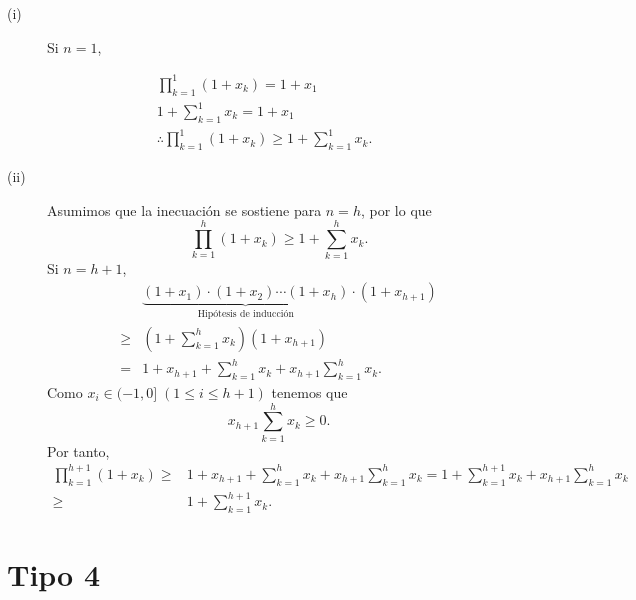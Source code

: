 \documentclass{article}
\begin{document}
\begin{sol}
\begin{description}
\item[(i)] Si $\displaystyle n = 1 $, 
\end{description}
\[
\begin{split}
& \prod^{1}_{k=1}\left(1+x_{k}\right) = 1 + x_{1} \\
& 1 + \sum^{1}_{k=1}x_{k} = 1 + x_{1} \\
& \therefore \prod^{1}_{k=1}\left(1+x_{k}\right) \geq 1 + \sum^{1}_{k=1}x_{k}.
\end{split}
\]
\begin{description}
\item[(ii)] Asumimos que la inecuación se sostiene para $\displaystyle n = h $, por lo que
\[\prod^{h}_{k=1}\left(1+x_{k}\right) \geq 1 + \sum^{h}_{k=1}x_{k} .\]
Si $\displaystyle n = h+1 $, 
\[
\begin{split}
& \underbrace{\left(1 + x_{1}\right)\cdot\left(1+x_{2}\right)\cdots\left(1+x_{h}\right)}_{\text{Hipótesis de inducción}}\cdot\left(1+x_{h+1}\right) \\
\geq & \left(1 + \sum^{h}_{k=1}x_{k}\right)\left(1+x_{h+1}\right) \\
= & 1 + x_{h+1} + \sum^{h}_{k=1}x_{k} + x_{h+1}\sum^{h}_{k=1}x_{k}.
\end{split}
\]
Como $\displaystyle x_{i} \in (-1,0] \; \left(1 \leq i \leq h+1\right)$ tenemos que 
\[x_{h+1}\sum^{h}_{k=1}x_{k} \geq 0 .\]
Por tanto, 
\[
\begin{split}
 \prod^{h+1}_{k=1}\left(1+x_{k}\right) 
 \geq &  1 + x_{h+1} + \sum^{h}_{k=1}x_{k} + x_{h+1}\sum^{h}_{k=1}x_{k} 
 =  1 + \sum^{h+1}_{k=1}x_{k} + x_{h+1}\sum^{h}_{k=1}x_{k} \\
\geq & 1 + \sum^{h+1}_{k=1}x_{k} .
\end{split}
\]

\end{description}

\end{sol}


\section{Tipo 4}
\end{document}
